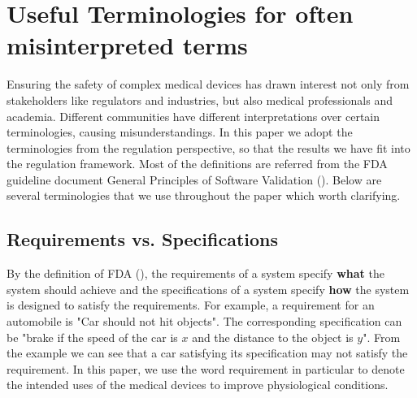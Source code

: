 \section{Useful Terminologies for often misinterpreted terms}
Ensuring the safety of complex medical devices has drawn interest not only from stakeholders like regulators and industries, but also medical professionals and academia. Different communities have different interpretations over certain terminologies, causing misunderstandings. In this paper we adopt the terminologies from the regulation perspective, so that the results we have fit into the regulation framework. Most of the definitions are referred from the FDA guideline document General Principles of Software Validation (\cite{fda2}). Below are several terminologies that we use throughout the paper which worth clarifying.
\subsection{Requirements vs. Specifications}
By the definition of FDA (\cite{fda3}), the requirements of a system specify \textbf{what} the system should achieve and the specifications of a system specify \textbf{how} the system is designed to satisfy the requirements. For example, a requirement for an automobile is "Car should not hit objects". The corresponding specification can be "brake if the speed of the car is $x$ and the distance to the object is $y$". From the example we can see that a car satisfying its specification may not satisfy the requirement. In this paper, we use the word requirement in particular to denote the intended uses of the medical devices to improve physiological conditions.

